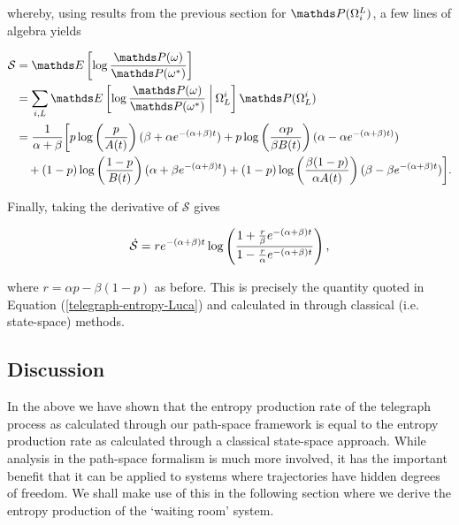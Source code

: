 whereby, using results from the previous section for $\bP(\Omega_i^L)$, a few lines of algebra yields 

\begin{align}
    \begin{split}
   \mathcal{S} &= \bE \left[ \log \frac{\bP(\omega)}{\bP(\omega^\ast)} \right]\\ &= \sum_{i, L} \bE\left [\log \frac{\bP(\omega)}{\bP(\omega^\ast)} \: \bigg\lvert \: \Omega_L^i  \right]\bP(\Omega^i_L) \\
    &= \frac{1}{\alpha +\beta}\bigg [ p\log\left(\frac{p}{A(t)}\right)(\beta + \alpha e^{-(\alpha + \beta)t}) +p\log\left(\frac{\alpha p}{\beta B(t)}\right)(\alpha - \alpha e^{-(\alpha + \beta)t)}) \\
    &\quad + (1-p)\log \left (\frac{1-p}{B(t)}\right)(\alpha + \beta e^{-(\alpha + \beta)t}) + (1-p)\log\left( \frac{\beta(1-p)}{\alpha A(t)}\right)(\beta -\beta e^{-(\alpha + \beta)t})\bigg].
    \end{split}
\end{align}

Finally, taking the derivative of $\mathcal{S}$ gives 

\begin{align}
\dot{\mathcal{S}} = re^{-(\alpha + \beta)t}\log\left(\frac{1+\frac{r}{\beta}e^{-(\alpha + \beta)t}}{1-\frac{r}{\alpha}e^{-(\alpha + \beta)t}}\right),
\end{align}

where $r = \alpha p - \beta (1-p)$ as before. This is precisely the quantity quoted in Equation (\ref{telegraph-entropy-Luca}) and calculated in \cite{cocconi2020entropy} through classical (i.e. state-space) methods. 

\subsection{Discussion}
In the above we have shown that the entropy production rate of the telegraph process as calculated through our path-space framework is equal to the entropy production rate as calculated through a classical state-space approach. While analysis in the path-space formalism is much more involved, it has the important benefit that it can be applied to systems where trajectories have hidden degrees of freedom. We shall make use of this in the following section where we derive the entropy production of the `waiting room' system.  







